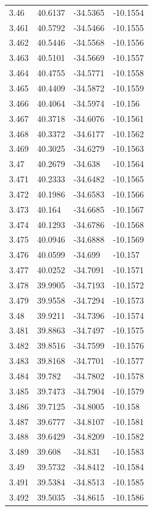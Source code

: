 \begin{tabular}{llll}
3.46 & 40.6137 & -34.5365 & -10.1554 \\
3.461 & 40.5792 & -34.5466 & -10.1555 \\
3.462 & 40.5446 & -34.5568 & -10.1556 \\
3.463 & 40.5101 & -34.5669 & -10.1557 \\
3.464 & 40.4755 & -34.5771 & -10.1558 \\
3.465 & 40.4409 & -34.5872 & -10.1559 \\
3.466 & 40.4064 & -34.5974 & -10.156 \\
3.467 & 40.3718 & -34.6076 & -10.1561 \\
3.468 & 40.3372 & -34.6177 & -10.1562 \\
3.469 & 40.3025 & -34.6279 & -10.1563 \\
3.47 & 40.2679 & -34.638 & -10.1564 \\
3.471 & 40.2333 & -34.6482 & -10.1565 \\
3.472 & 40.1986 & -34.6583 & -10.1566 \\
3.473 & 40.164 & -34.6685 & -10.1567 \\
3.474 & 40.1293 & -34.6786 & -10.1568 \\
3.475 & 40.0946 & -34.6888 & -10.1569 \\
3.476 & 40.0599 & -34.699 & -10.157 \\
3.477 & 40.0252 & -34.7091 & -10.1571 \\
3.478 & 39.9905 & -34.7193 & -10.1572 \\
3.479 & 39.9558 & -34.7294 & -10.1573 \\
3.48 & 39.9211 & -34.7396 & -10.1574 \\
3.481 & 39.8863 & -34.7497 & -10.1575 \\
3.482 & 39.8516 & -34.7599 & -10.1576 \\
3.483 & 39.8168 & -34.7701 & -10.1577 \\
3.484 & 39.782 & -34.7802 & -10.1578 \\
3.485 & 39.7473 & -34.7904 & -10.1579 \\
3.486 & 39.7125 & -34.8005 & -10.158 \\
3.487 & 39.6777 & -34.8107 & -10.1581 \\
3.488 & 39.6429 & -34.8209 & -10.1582 \\
3.489 & 39.608 & -34.831 & -10.1583 \\
3.49 & 39.5732 & -34.8412 & -10.1584 \\
3.491 & 39.5384 & -34.8513 & -10.1585 \\
3.492 & 39.5035 & -34.8615 & -10.1586 \\

\end{tabular}
